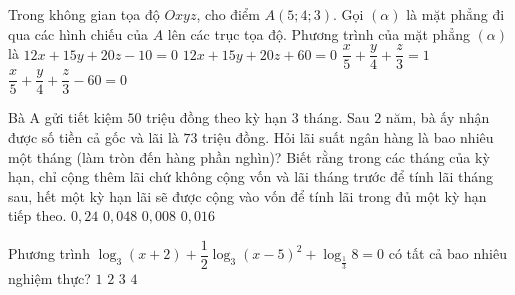 \begin{ex}%
	Trong không gian tọa độ $Oxyz$, cho điểm $A(5;4;3)$. Gọi $(\alpha)$ là mặt phẳng đi qua các hình chiếu của $A$ lên các trục tọa độ. Phương trình của mặt phẳng $(\alpha)$ là
	\choice
	{$12x+15y+20z-10=0$}
	{$12x+15y+20z+60=0$}
	{\True $\dfrac{x}{5}+\dfrac{y}{4}+\dfrac{z}{3}=1$}
	{$\dfrac{x}{5}+\dfrac{y}{4}+\dfrac{z}{3}-60=0$}
\end{ex}

\begin{ex}%
	Bà A gửi tiết kiệm $50$ triệu đồng theo kỳ hạn $3$ tháng. Sau $2$ năm, bà ấy nhận được số tiền cả gốc và lãi là $73$ triệu đồng. Hỏi lãi suất ngân hàng là bao nhiêu một tháng (làm tròn đến hàng phần nghìn)? Biết rằng trong các tháng của kỳ hạn, chỉ cộng thêm lãi chứ không cộng vốn và lãi tháng trước để tính lãi tháng sau, hết một kỳ hạn lãi sẽ được cộng vào vốn để tính lãi trong đủ một kỳ hạn tiếp theo.
	\choice
	{$0{,}24$}
	{$0{,}048$}
	{$0{,}008$}
	{\True $0{,}016$}
\end{ex}

\begin{ex}%
	Phương trình $\log_3 (x+2) + \dfrac{1}{2} \log_3 (x-5)^2 + \log_{\frac{1}{3}} 8 =0$ có tất cả bao nhiêu nghiệm thực?
	\choice
	{$1$}
	{$2$}
	{\True $3$}
	{$4$}
\end{ex}

